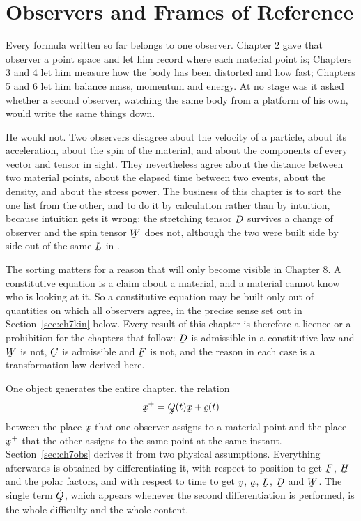 \chapter{Observers and Frames of Reference}

Every formula written so far belongs to one observer. Chapter 2 gave that
observer a point space and let him record where each material point is;
Chapters 3 and 4 let him measure how the body has been distorted and how
fast; Chapters 5 and 6 let him balance mass, momentum and energy. At no
stage was it asked whether a second observer, watching the same body from
a platform of his own, would write the same things down.

He would not. Two observers disagree about the velocity of a particle,
about its acceleration, about the spin of the material, and about the
components of every vector and tensor in sight. They nevertheless agree
about the distance between two material points, about the elapsed time
between two events, about the density, and about the stress power. The
business of this chapter is to sort the one list from the other, and to
do it by calculation rather than by intuition, because intuition gets it
wrong: the stretching tensor $\bD$ survives a change of observer and the
spin tensor $\bW$ does not, although the two were built side by side out
of the same $\bL$ in .

The sorting matters for a reason that will only become visible in
Chapter 8. A constitutive equation is a claim about a material, and a
material cannot know who is looking at it. So a constitutive equation may
be built only out of quantities on which all observers agree, in the
precise sense set out in Section~\ref{sec:ch7kin} below. Every result of
this chapter is therefore a licence or a prohibition for the chapters
that follow: $\bD$ is admissible in a constitutive law and $\bW$ is not,
$\bC$ is admissible and $\bF$ is not, and the reason in each case is a
transformation law derived here.

One object generates the entire chapter, the relation
\[
   \bx^{+}=\bQ(t)\bx+\bc(t)
\]
between the place $\bx$ that one observer assigns to a material point and
the place $\bx^{+}$ that the other assigns to the same point at the same
instant. Section~\ref{sec:ch7obs} derives it from two physical
assumptions. Everything afterwards is obtained by differentiating it,
with respect to position to get $\bF$, $\bH$ and the polar factors, and
with respect to time to get $\bv$, $\ba$, $\bL$, $\bD$ and $\bW$. The
single term $\dot\bQ$, which appears whenever the second differentiation
is performed, is the whole difficulty and the whole content.

